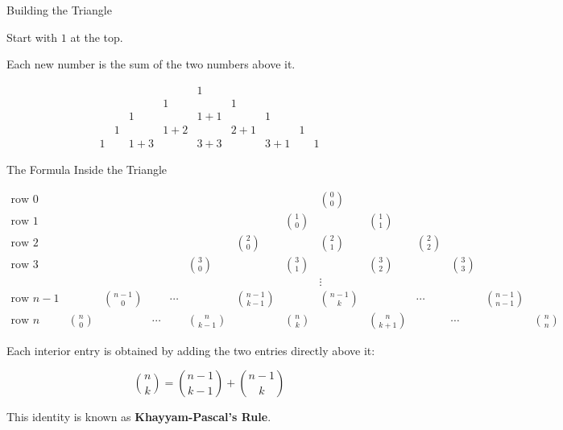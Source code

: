 \begin{frame}{Building the Triangle}

Start with $1$ at the top.

\vspace{0.25cm}

Each new number is the sum of the two numbers above it.

\[
\begin{array}{ccccccccc}
&&&&1&&&&\\[2mm]
&&&1&&1&&&\\[2mm]
&&1&&\boxed{1+1}&&1&&\\[2mm]
&1&&\boxed{1+2}&&\boxed{2+1}&&1&\\[2mm]
1&&\boxed{1+3}&&\boxed{3+3}&&\boxed{3+1}&&1
\end{array}
\]


\end{frame}
\begin{frame}{The Formula Inside the Triangle}

\small

\[
\renewcommand{\arraystretch}{1.35}
\begin{array}{ccccccccccccccccc}

\text{row }0
&&&&&&&& \binom{0}{0} &&&&&&&&  \\

\text{row }1
&&&&&&& \binom{1}{0} && \binom{1}{1} &&&&&&&  \\

\text{row }2
&&&&&& \binom{2}{0} && \binom{2}{1} && \binom{2}{2} &&&&&&  \\

\text{row }3
&&&&& \binom{3}{0} && \binom{3}{1} && \binom{3}{2} && \binom{3}{3} &&&&&  \\

&&&&&&&& \vdots &&&&&&&& \\[1mm]

\text{row }n-1
&&
\binom{n-1}{0}
&&
\cdots
&&
{\binom{n-1}{k-1}}
&&
{\binom{n-1}{k}}
&&
\cdots
&&
\binom{n-1}{n-1}
&&&&
\\[2mm]

\text{row }n
&
\binom{n}{0}
&&
\cdots
&&
\binom{n}{k-1}
&&
{\binom{n}{k}}
&&
\binom{n}{k+1}
&&
\cdots
&&
\binom{n}{n}
&&&
\end{array}
\]

\vspace{0.35cm}

Each interior entry is obtained by adding the two entries directly above it:

\[
\boxed{
\binom{n}{k}
=
\binom{n-1}{k-1}
+
\binom{n-1}{k}
}
\]

\vspace{0.15cm}

This identity is known as \textbf{Khayyam-Pascal's Rule}.

\end{frame}



